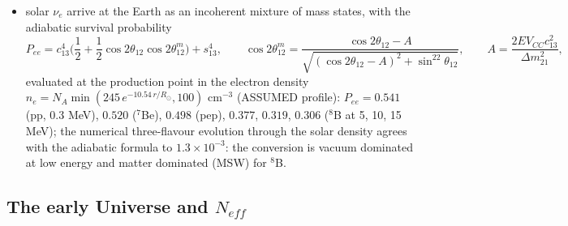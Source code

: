 \documentclass[
  10pt,
]{article}
\providecommand{\tightlist}{%
  \setlength{\itemsep}{0pt}\setlength{\parskip}{0pt}}
\begin{document}
\begin{itemize}
\tightlist
\item
  solar \(\nu_e\) arrive at the Earth as an incoherent mixture of mass
  states, with the adiabatic survival probability
  \[ P_{ee} = c_{13}^4\Big(\frac12 + \frac12\cos2\theta_{12}\cos2\theta^m_{12}\Big) + s_{13}^4,\qquad
   \cos2\theta^m_{12} = \frac{\cos2\theta_{12} - A}{\sqrt{(\cos2\theta_{12} - A)^2 + \sin^22\theta_{12}}},\qquad A = \frac{2EV_{CC}c_{13}^2}{\Delta m^2_{21}}, \]
  evaluated at the production point in the electron density
  \(n_e = N_A\min(245\,e^{-10.54\,r/R_\odot}, 100)\) cm\(^{-3}\)
  (ASSUMED profile): \(P_{ee} = 0.541\) (pp, 0.3 MeV), \(0.520\)
  (\(^7\)Be), \(0.498\) (pep), \(0.377\), \(0.319\), \(0.306\) (\(^8\)B
  at 5, 10, 15 MeV); the numerical three-flavour evolution through the
  solar density agrees with the adiabatic formula to
  \(1.3\times10^{-3}\): the conversion is vacuum dominated at low energy
  and matter dominated (MSW) for \(^8\)B.
\end{itemize}

\hypertarget{the-early-universe-and-n_eff}{%
\subsection{\texorpdfstring{The early Universe and
\(N_{eff}\)}{The early Universe and N\_\{eff\}}}\label{the-early-universe-and-n_eff}}
\end{document}
